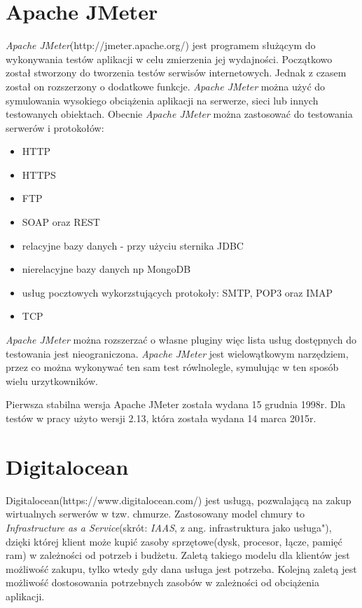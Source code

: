 \section{Apache JMeter}
\textsl{Apache JMeter}(http://jmeter.apache.org/) jest programem służącym do wykonywania testów aplikacji w celu zmierzenia jej wydajności.  Początkowo został stworzony do tworzenia testów serwisów internetowych. Jednak z czasem został on rozszerzony o dodatkowe funkcje. \textsl{Apache JMeter} można użyć do symulowania wysokiego obciążenia aplikacji na serwerze, sieci lub innych testowanych obiektach.
Obecnie \textsl{Apache JMeter} można zastosować do testowania serwerów i protokołów:
\begin{itemize}
\item HTTP
\item HTTPS
\item FTP
\item SOAP oraz REST
\item relacyjne bazy danych - przy użyciu sternika JDBC
\item nierelacyjne bazy danych np MongoDB
\item usług pocztowych wykorzstujących protokoły: SMTP, POP3 oraz IMAP
\item TCP
\end{itemize}

\textsl{Apache JMeter} można rozszerzać o własne pluginy więc lista usług dostępnych do testowania jest nieograniczona. \textsl{Apache JMeter} jest wielowątkowym narzędziem, przez co można wykonywać ten sam test rówlnolegle, symulując w ten sposób wielu urzytkowników. 

Pierwsza stabilna wersja Apache JMeter została wydana 15 grudnia 1998r. Dla testów w pracy użyto wersji 2.13, która została wydana 14 marca 2015r.

\section{Digitalocean}
Digitalocean(https://www.digitalocean.com/) jest usługą, pozwalającą na zakup wirtualnych serwerów w tzw. chmurze. Zastosowany model chmury to \textsl{Infrastructure as a Service}(skrót: \textsl{IAAS}, z ang. infrastruktura jako usługa"), dzięki której klient może kupić zasoby sprzętowe(dysk, procesor, łącze, pamięć ram) w zależności od potrzeb i budżetu. Zaletą takiego modelu dla klientów jest możliwość zakupu, tylko wtedy gdy dana usługa jest potrzeba. Kolejną zaletą jest możliwość dostosowania potrzebnych zasobów w zależności od obciążenia aplikacji.

